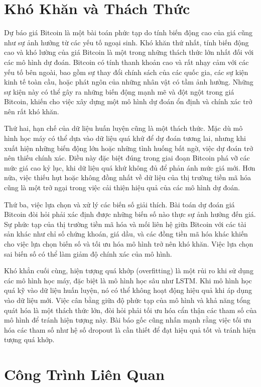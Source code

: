 \section{Khó Khăn và Thách Thức}

Dự báo giá Bitcoin là một bài toán phức tạp do tính biến động cao của giá cũng như sự ảnh hưởng từ các yếu tố ngoại sinh. Khó khăn thứ nhất, tính biến động cao và khó lường của giá Bitcoin là một trong những thách thức lớn nhất đối với các mô hình dự đoán. Bitcoin có tính thanh khoản cao và rất nhạy cảm với các yếu tố bên ngoài, bao gồm sự thay đổi chính sách của các quốc gia, các sự kiện kinh tế toàn cầu, hoặc phát ngôn của những nhân vật có tầm ảnh hưởng. Những sự kiện này có thể gây ra những biến động mạnh mẽ và đột ngột trong giá Bitcoin, khiến cho việc xây dựng một mô hình dự đoán ổn định và chính xác trở nên rất khó khăn.

Thứ hai, hạn chế của dữ liệu huấn luyện cũng là một thách thức. Mặc dù mô hình học máy có thể dựa vào dữ liệu quá khứ để dự đoán tương lai, nhưng khi xuất hiện những biến động lớn hoặc những tình huống bất ngờ, việc dự đoán trở nên thiếu chính xác. Điều này đặc biệt đúng trong giai đoạn Bitcoin phá vỡ các mức giá cao kỷ lục, khi dữ liệu quá khứ không đủ để phản ánh mức giá mới. Hơn nữa, việc thiếu hụt hoặc không đồng nhất về dữ liệu của thị trường tiền mã hóa cũng là một trở ngại trong việc cải thiện hiệu quả của các mô hình dự đoán.

Thứ ba, việc lựa chọn và xử lý các biến số giải thích. Bài toán dự đoán giá Bitcoin đòi hỏi phải xác định được những biến số nào thực sự ảnh hưởng đến giá. Sự phức tạp của thị trường tiền mã hóa và mối liên hệ giữa Bitcoin với các tài sản khác như chỉ số chứng khoán, giá dầu, và các đồng tiền mã hóa khác khiến cho việc lựa chọn biến số và tối ưu hóa mô hình trở nên khó khăn. Việc lựa chọn sai biến số có thể làm giảm độ chính xác của mô hình.

Khó khẳn cuối cùng, hiện tượng quá khớp (overfitting) là một rủi ro khi sử dụng các mô hình học máy, đặc biệt là mô hình học sâu như LSTM. Khi mô hình học quá kỹ vào dữ liệu huấn luyện, nó có thể không hoạt động hiệu quả khi áp dụng vào dữ liệu mới. Việc cân bằng giữa độ phức tạp của mô hình và khả năng tổng quát hóa là một thách thức lớn, đòi hỏi phải tối ưu hóa cẩn thận các tham số của mô hình để tránh hiện tượng này. Bài báo gốc cũng nhấn mạnh rằng việc tối ưu hóa các tham số như hệ số dropout là cần thiết để đạt hiệu quả tốt và tránh hiện tượng quá khớp.

\section{Công Trình Liên Quan}

